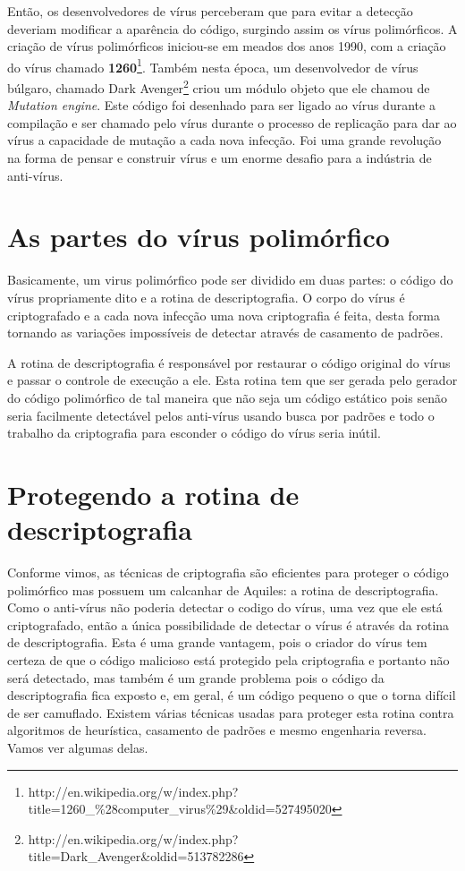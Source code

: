 Então, os desenvolvedores de vírus perceberam que para evitar a detecção deveriam modificar a aparência do código, surgindo assim os vírus polimórficos. A criação de vírus polimórficos iniciou-se em meados dos anos 1990, com a criação do vírus chamado \textbf{1260}\footnote{http://en.wikipedia.org/w/index.php?title=1260\_\%28computer\_virus\%29\&oldid=527495020}. Também nesta época, um desenvolvedor de vírus búlgaro, chamado Dark Avenger\footnote{http://en.wikipedia.org/w/index.php?title=Dark\_Avenger\&oldid=513782286} criou um módulo objeto que ele chamou de \textit{Mutation engine}. Este código foi desenhado para ser ligado ao vírus durante a compilação e ser chamado pelo vírus durante o processo de replicação para dar ao vírus a capacidade de mutação a cada nova infecção. Foi uma grande revolução na forma de pensar e construir vírus e um enorme desafio para a indústria de anti-vírus. 

\section{As partes do vírus polimórfico}
Basicamente, um virus polimórfico pode ser dividido em duas partes: o código do vírus propriamente dito e a rotina de descriptografia. O corpo do vírus é criptografado e a cada nova infecção uma nova criptografia é feita, desta forma tornando as variações impossíveis de detectar através de casamento de padrões.

A rotina de descriptografia é responsável por restaurar o código original do vírus e passar o controle de execução a ele. Esta rotina tem que ser gerada pelo gerador do código polimórfico de tal maneira que não seja um código estático pois senão seria facilmente detectável pelos anti-vírus usando busca por padrões e todo o trabalho da criptografia para esconder o código do vírus seria inútil.


\section{Protegendo a rotina de descriptografia}
Conforme vimos, as técnicas de criptografia são eficientes para proteger o código polimórfico mas possuem um calcanhar de Aquiles: a rotina de descriptografia. Como o anti-vírus não poderia detectar o codigo do vírus, uma vez que ele está criptografado, então a única possibilidade de detectar o vírus é através da rotina de descriptografia. Esta é uma grande vantagem, pois o criador do vírus tem certeza de que o código malicioso está protegido pela criptografia e portanto não será detectado, mas também é um grande problema pois o código da descriptografia fica exposto e, em geral, é um código pequeno o que o torna difícil de ser camuflado. Existem várias técnicas usadas para proteger esta rotina contra algoritmos de heurística, casamento de padrões e mesmo engenharia reversa. Vamos ver algumas delas.

